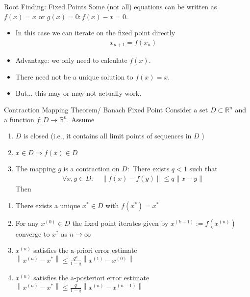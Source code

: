 \documentclass[xcolor=pdftex,dvipsnames,table,mathserif,aspectratio=169]{beamer}
\begin{document}
\begin{frame}{Root Finding: Fixed Points}
Some (not all) equations can be written as $f(x) = x$ or $g(x)=0: f(x)-x =0$.
\begin{itemize}
\item In this case we can iterate on the \alert{fixed point} directly
\begin{align*}
x_{n+1} = f(x_n)
\end{align*}
\item Advantage: we only need to calculate $f(x)$.
\item There need not be a unique solution to $f(x) = x$.
\item But... this may or may not actually work.
\end{itemize}
\end{frame}

\begin{frame}{Contraction Mapping Theorem/ Banach Fixed Point}
\small
Consider a set $D \subset \mathbb{R}^{n}$ and a function $f: D \rightarrow \mathbb{R}^{n} .$ Assume
\begin{enumerate}
\item $D$ is closed (i.e., it contains all limit points of sequences in $D$ )
\item $x \in D \Longrightarrow f(x) \in D$
\item The mapping $g$ is a contraction on $D:$ There exists $q<1$ such that
\begin{align*}
\forall x, y \in D: \quad\|f(x)-f(y)\| \leq q\|x-y\|
\end{align*}
\noindent Then \vspace{-.3cm}
\end{enumerate}
\begin{enumerate}
\item There exists a unique  $x^{*} \in D$ with $f\left(x^{*}\right)=x^{*}$
\item For any $x^{(0)} \in D$ the fixed point iterates given by $x^{(k+1)}:=f\left(x^{(n)}\right)$ converge to $x^{*}$ as $n \rightarrow \infty$
\item $x^{(n)}$ satisfies the \alert{a-priori error} estimate $\left\|x^{(n)}-x^{*}\right\| \leq \frac{q^{n}}{1-q}\left\|x^{(1)}-x^{(0)}\right\|$
\item $x^{(n)}$ satisfies the \alert{a-posteriori error} estimate $\left\|x^{(n)}-x^{*}\right\| \leq \frac{q}{1-q}\left\|x^{(n)}-x^{(n-1)}\right\|$
\end{enumerate}
\end{frame}
\end{document}
